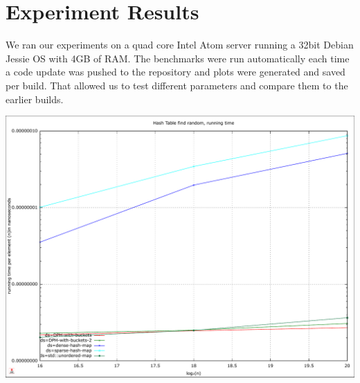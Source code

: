 \documentclass{article}
\begin{document}
\section{Experiment Results}

We ran our experiments on a quad core Intel Atom server running a 32bit Debian
Jessie OS with 4GB of RAM. The benchmarks were run automatically each time a
code update was pushed to the repository and plots were generated and saved per
build. That allowed us to test different parameters and compare them to the
earlier builds.

\includegraphics[width=\linewidth]{img/hash_find-random_time}

\printbibliography
\end{document}
